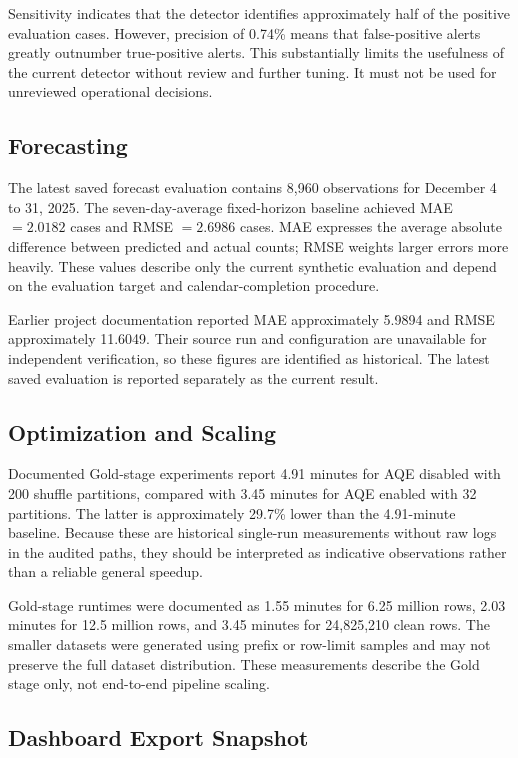 ﻿\documentclass[conference]{IEEEtran}
\begin{document}
Sensitivity indicates that the detector identifies approximately half of the positive evaluation cases. However, precision of 0.74\% means that false-positive alerts greatly outnumber true-positive alerts. This substantially limits the usefulness of the current detector without review and further tuning. It must not be used for unreviewed operational decisions.

\subsection{Forecasting}

The latest saved forecast evaluation contains 8,960 observations for December 4 to 31, 2025. The seven-day-average fixed-horizon baseline achieved MAE \(=2.0182\) cases and RMSE \(=2.6986\) cases. MAE expresses the average absolute difference between predicted and actual counts; RMSE weights larger errors more heavily. These values describe only the current synthetic evaluation and depend on the evaluation target and calendar-completion procedure.

Earlier project documentation reported MAE approximately 5.9894 and RMSE approximately 11.6049. Their source run and configuration are unavailable for independent verification, so these figures are identified as historical. The latest saved evaluation is reported separately as the current result.

\subsection{Optimization and Scaling}

Documented Gold-stage experiments report 4.91 minutes for AQE disabled with 200 shuffle partitions, compared with 3.45 minutes for AQE enabled with 32 partitions. The latter is approximately 29.7\% lower than the 4.91-minute baseline. Because these are historical single-run measurements without raw logs in the audited paths, they should be interpreted as indicative observations rather than a reliable general speedup.

Gold-stage runtimes were documented as 1.55 minutes for 6.25 million rows, 2.03 minutes for 12.5 million rows, and 3.45 minutes for 24,825,210 clean rows. The smaller datasets were generated using prefix or row-limit samples and may not preserve the full dataset distribution. These measurements describe the Gold stage only, not end-to-end pipeline scaling.

\subsection{Dashboard Export Snapshot}
\end{document}
